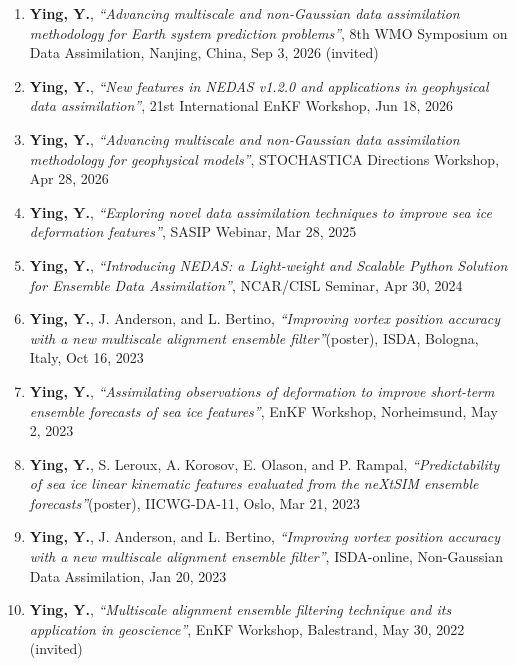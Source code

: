 \begin{enumerate}
\item \textbf{Ying, Y.},
\textit{``Advancing multiscale and non-Gaussian data assimilation methodology for Earth system prediction problems''},
8th WMO Symposium on Data Assimilation, Nanjing, China, Sep 3, 2026
(invited)

\item \textbf{Ying, Y.},
\textit{``New features in NEDAS v1.2.0 and applications in geophysical data assimilation''},
21st International EnKF Workshop, Jun 18, 2026

\item \textbf{Ying, Y.},
\textit{``Advancing multiscale and non-Gaussian data assimilation methodology for geophysical models''},
STOCHASTICA Directions Workshop, Apr 28, 2026

\item \textbf{Ying, Y.},
\textit{``Exploring novel data assimilation techniques to improve sea ice deformation features''},
SASIP Webinar, Mar 28, 2025

\item \textbf{Ying, Y.},
\textit{``Introducing NEDAS: a Light-weight and Scalable Python Solution for Ensemble Data Assimilation''},
NCAR/CISL Seminar, Apr 30, 2024

\item \textbf{Ying, Y.}, J. Anderson, and L. Bertino,
\textit{``Improving vortex position accuracy with a new multiscale alignment ensemble filter''}(poster),
ISDA, Bologna, Italy, Oct 16, 2023

\item \textbf{Ying, Y.},
\textit{``Assimilating observations of deformation to improve short-term ensemble forecasts of sea ice features''},
EnKF Workshop, Norheimsund, May 2, 2023

\item \textbf{Ying, Y.}, S. Leroux, A. Korosov, E. Olason, and P. Rampal,
\textit{``Predictability of sea ice linear kinematic features evaluated from the neXtSIM ensemble forecasts''}(poster),
IICWG-DA-11, Oslo, Mar 21, 2023

\item \textbf{Ying, Y.}, J. Anderson, and L. Bertino,
\textit{``Improving vortex position accuracy with a new multiscale alignment ensemble filter''},
ISDA-online, Non-Gaussian Data Assimilation, Jan 20, 2023

\item \textbf{Ying, Y.},
\textit{``Multiscale alignment ensemble filtering technique and its application in geoscience''},
EnKF Workshop, Balestrand, May 30, 2022
(invited)


\end{enumerate}
